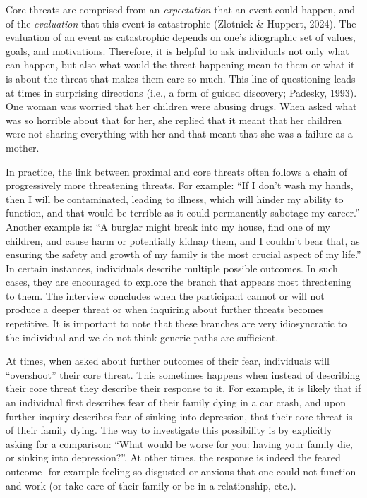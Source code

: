 \documentclass[
  man,floatsintext]{apa7}
\begin{document}
Core threats are comprised from an \emph{expectation} that an event could happen, and of the \emph{evaluation} that this event is catastrophic (Zlotnick \& Huppert, 2024).
The evaluation of an event as catastrophic depends on one's idiographic set of values, goals, and motivations.
Therefore, it is helpful to ask individuals not only what can happen, but also what would the threat happening mean to them or what it is about the threat that makes them care so much.
This line of questioning leads at times in surprising directions (i.e., a form of guided discovery; Padesky, 1993).
One woman was worried that her children were abusing drugs.
When asked what was so horrible about that for her, she replied that
it meant that her children were not sharing everything with her and that meant that she was a failure as a mother.

In practice, the link between proximal and core threats often follows a chain of progressively more threatening threats.
For example: ``If I don't wash my hands, then I will be contaminated, leading to illness, which will hinder my ability to function, and that would be terrible as it could permanently sabotage my career.''
Another example is: ``A burglar might break into my house, find one of my children, and cause harm or potentially kidnap them, and I couldn't bear that, as ensuring the safety and growth of my family is the most crucial aspect of my life.''
In certain instances, individuals describe multiple possible outcomes.
In such cases, they are encouraged to explore the branch that appears most threatening to them.
The interview concludes when the participant cannot or will not produce a deeper threat or when inquiring about further threats becomes repetitive.
It is important to note that these branches are very idiosyncratic to the individual and we do not think generic paths are sufficient.

At times, when asked about further outcomes of their fear, individuals will ``overshoot'' their core threat.
This sometimes happens when instead of describing their core threat they describe their response to it.
For example, it is likely that if an individual first describes fear of their family dying in a car crash, and upon further inquiry describes fear of sinking into depression, that their core threat is of their family dying.
The way to investigate this possibility is by explicitly asking for a comparison: ``What would be worse for you: having your family die, or sinking into depression?''.
At other times, the response is indeed the feared outcome- for example feeling so disgusted or anxious that one could not function and work (or take care of their family or be in a relationship, etc.).
\end{document}
